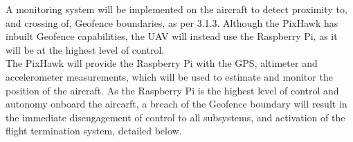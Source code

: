 A monitoring system will be implemented on the aircraft to detect proximity to, and crossing of, Geofence boundaries, as per 3.1.3. Although the PixHawk has inbuilt Geofence capabilities, the UAV will instead use the Raspberry Pi, as it will be at the highest level of control.\\

The PixHawk will provide the Raspberry Pi with the GPS, altimeter and accelerometer measurements, which will be used to estimate and monitor the position of the aircraft. As the Raspberry Pi is the highest level of control and autonomy onboard the aircarft, a breach of the Geofence boundary will result in the immediate disengagement of control to all subsystems, and activation of the flight termination system, detailed below.
